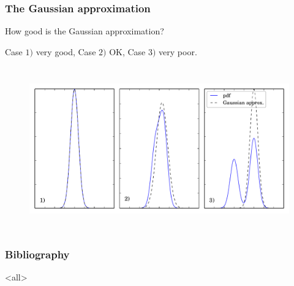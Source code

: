 \begin{frame}

\frametitle{The Gaussian approximation}
\label{thegaussianapproximation}


How good is the Gaussian approximation?

Case $1)$ very good, Case $2)$ OK, Case $3)$ very poor.

\begin{figure}[htbp]
\centering
\includegraphics[keepaspectratio,width=\textwidth,height=200pt]{figures/gaussian_approximation.pdf}
\label{gaussian_approximation}
\end{figure}

\end{frame}

\begin{frame}

\frametitle{Bibliography}
\label{bibliography}







\end{frame}

\mode<all>


\mode*

